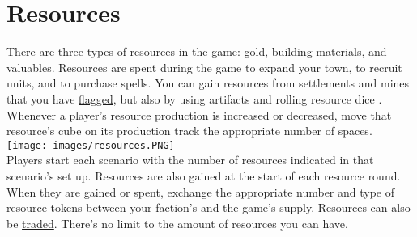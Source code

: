 \documentclass[12pt]{article}
\begin{document}
\clearpage
\section{Resources}
There are three types of resources in the game: gold, building materials, and valuables.
Resources are spent during the game to expand your town, to recruit units, and to purchase spells. You can gain resources from settlements and mines that you have \hyperlink{Categories}{flagged}, but also by using artifacts and rolling resource dice . Whenever a player's resource production is increased or decreased, move that resource's cube on its production track the appropriate number of spaces.\\[6pt]
\texttt{[image: images/resources.PNG]}\\
Players start each scenario with the number of resources indicated in that scenario’s set up.
Resources are also gained at the start of each resource round. When they are gained or spent, exchange the appropriate number and type of resource tokens between your faction's and the game's supply. Resources can also be \hyperlink{Trading}{traded}. There's no limit to the amount of resources you can have.
\end{document}
